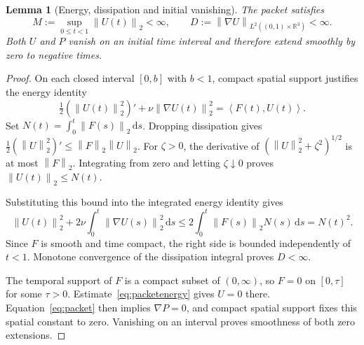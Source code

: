 \documentclass[11pt,a4paper]{article}
\newtheorem{lemma}[theorem]{Lemma}
\theoremstyle{definition}\newtheorem{definition}[theorem]{Definition}
\theoremstyle{remark}\newtheorem{remark}[theorem]{Remark}
\newcommand{\R}{\mathbb R}\newcommand{\TT}{\mathbb T^3}
\newcommand{\dd}{\,\mathrm d}\newcommand{\eps}{\varepsilon}
\newcommand{\norm}[1]{\left\lVert#1\right\rVert}
\newcommand{\ip}[2]{\left\langle#1,#2\right\rangle}
\begin{document}
\begin{lemma}[Energy, dissipation and initial vanishing]\label{lem:packetenergy}
The packet satisfies
\[
 M:=\sup_{0\le t<1}\norm{U(t)}_2<\infty,\qquad
 D:=\norm{\nabla U}_{L^2((0,1)\times\R^3)}<\infty.
\]
Both $U$ and $P$ vanish on an initial time interval and therefore extend smoothly by zero to negative times.
\end{lemma}
\begin{proof}
On each closed interval $[0,b]$ with $b<1$, compact spatial support justifies the energy identity
\[
 \tfrac12(\norm{U(t)}_2^2)'
 +\nu\norm{\nabla U(t)}_2^2=\ip{F(t)}{U(t)}.
\]
Set $N(t)=\int_0^t\norm{F(s)}_2\dd s$. Dropping dissipation gives
$\tfrac12(\norm{U}_2^2)'\le\norm{F}_2\norm{U}_2$.
For $\zeta>0$, the derivative of $(\norm{U}_2^2+\zeta^2)^{1/2}$ is at most $\norm{F}_2$. Integrating from zero and letting $\zeta\downarrow0$ proves $\norm{U(t)}_2\le N(t)$.

Substituting this bound into the integrated energy identity gives
\begin{equation}\label{eq:packetenergy}
 \norm{U(t)}_2^2+2\nu\int_0^t\norm{\nabla U(s)}_2^2\dd s
 \le 2\int_0^t\norm{F(s)}_2N(s)\dd s=N(t)^2.
\end{equation}
Since $F$ is smooth and time compact, the right side is bounded independently of $t<1$. Monotone convergence of the dissipation integral proves $D<\infty$.

The temporal support of $F$ is a compact subset of $(0,\infty)$, so $F=0$ on $[0,\tau]$ for some $\tau>0$. Estimate~\eqref{eq:packetenergy} gives $U=0$ there. Equation~\eqref{eq:packet} then implies $\nabla P=0$, and compact spatial support fixes this spatial constant to zero. Vanishing on an interval proves smoothness of both zero extensions.
\end{proof}
\end{document}
